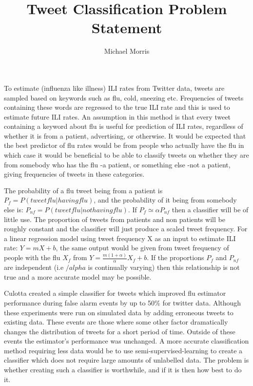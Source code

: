 \documentclass[a4paper]{article}
\title{Tweet Classification Problem Statement}
\author{Michael Morris}
\begin{document}
\maketitle
To estimate (influenza like illness) ILI rates from Twitter data, tweets are sampled based on keywords such as flu, cold, sneezing etc. Frequencies of tweets containing these words are regressed to the true ILI rate and this is used to estimate future ILI rates. 
An assumption in this method is that every tweet containing a keyword about flu is useful for prediction of ILI rates, regardless of whether it is from a patient, advertising, or otherwise.
It would be expected that the best predictor of flu rates would be from people who actually have the flu in which case it would be beneficial to be able to classify tweets on whether they are from somebody who has the flu -a patient, or something else -not a patient, giving frequencies of tweets in these categories. 

The probability of a flu tweet being from a patient is $P_f = P(tweet flu|having flu)$, and the probability of it being from somebody else is: $P_{nf} = P(tweet flu | not having flu)$. If $P_f\simeq \alpha P_{nf}$ then a classifier will be of little use.  The proportion of tweets from patients and non patients will be roughly constant and the classifier will just produce a scaled tweet frequency.
For a linear regression model using tweet frequency X as an input to estimate ILI rate: $Y=mX+b$, the same output would be given from tweet frequency of people with the flu $X_f$ from $Y= \frac{m(1+\alpha)}{\alpha}X_f+b$. If the proportions $P_f$ and $P_{nf}$ are independent (i.e $/alpha$ is continually varying) then this relationship is not true and a more accurate model may be possible.

Culotta \cite{Culotta} created a simple classifier for tweets which improved flu estimator performance during false alarm events by up to 50\% for twitter data. Although these experiments were run on simulated data by adding erroneous tweets to existing data. These events are those where some other factor dramatically changes the distribution of tweets for a short period of time. Outside of these events the estimator's performance was unchanged. A more accurate classification method requiring less data would be to use semi-supervised-learning to create a classifier which does not require large amounts of unlabelled data. The problem is whether creating such a classifier is worthwhile, and if it is then how best to do it.

 {}

\end{document}
